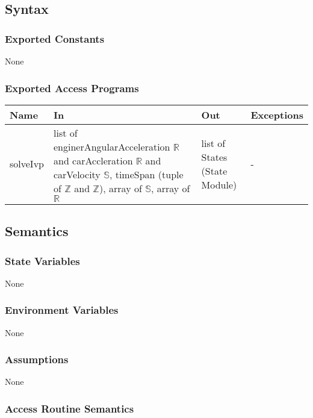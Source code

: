 \documentclass[12pt, titlepage]{article}
\begin{document}
\subsection{Syntax}

\subsubsection{Exported Constants}
None

\subsubsection{Exported Access Programs}

\begin{center}
\begin{tabular}{p{2cm} p{4cm} p{4cm} p{2cm}}
\hline
\textbf{Name} & \textbf{In} & \textbf{Out} & \textbf{Exceptions} \\
\hline
solveIvp & list of enginerAngularAcceleration $\mathbb{R}$ and carAccleration $\mathbb{R}$ and carVelocity $\mathbb{S}$, timeSpan (tuple of $\mathbb{Z}$ and $\mathbb{Z}$), array of $\mathbb{S}$, array of $\mathbb{R}$  & list of States (State Module) & - \\
\hline
\end{tabular}
\end{center}

\subsection{Semantics}

\subsubsection{State Variables}

None

\subsubsection{Environment Variables}

None

\subsubsection{Assumptions}

None

\subsubsection{Access Routine Semantics}
\end{document}
